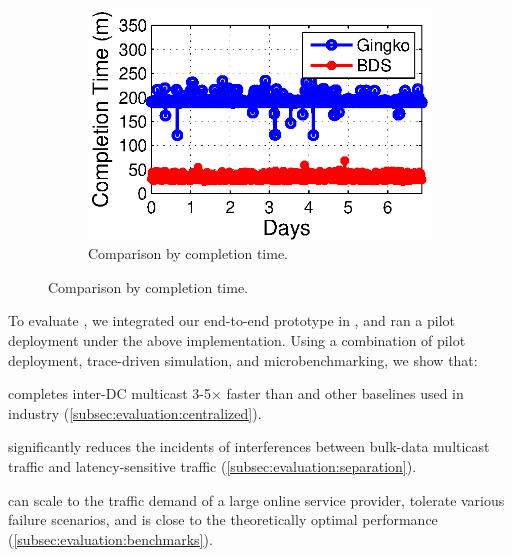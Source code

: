 \begin{figure}[t]
\begin{subfigure}[b]{0.3\textwidth}
                \label{fig:BDSvsAnon:FCT}
        \end{subfigure}
        \begin{subfigure}[b]{0.3\textwidth}
                \centering
                \includegraphics[width=\textwidth]{images/BDSvsAnon_time_v2.eps}
                \caption{Comparison by completion time.}
                \label{fig:BDSvsAnon:time}
        \end{subfigure}
        \label{fig:BDSvsAnon}
\vspace{-0.4cm}
\end{figure}

To evaluate \name, we integrated our end-to-end prototype in \company, and ran a pilot deployment under the above implementation.
Using a combination of pilot deployment, trace-driven simulation, and microbenchmarking, we show that:
\begin{packedenumerate}
\item \name completes inter-DC multicast 3-5$\times$ faster than \alg and other baselines used in industry (\Section\ref{subsec:evaluation:centralized}).
\item \name significantly reduces the incidents of interferences between bulk-data multicast traffic and latency-sensitive traffic (\Section\ref{subsec:evaluation:separation}).
\item \name can scale to the traffic demand of a large online service provider, tolerate various failure scenarios, and is close to the theoretically optimal performance (\Section\ref{subsec:evaluation:benchmarks}).
\end{packedenumerate}

